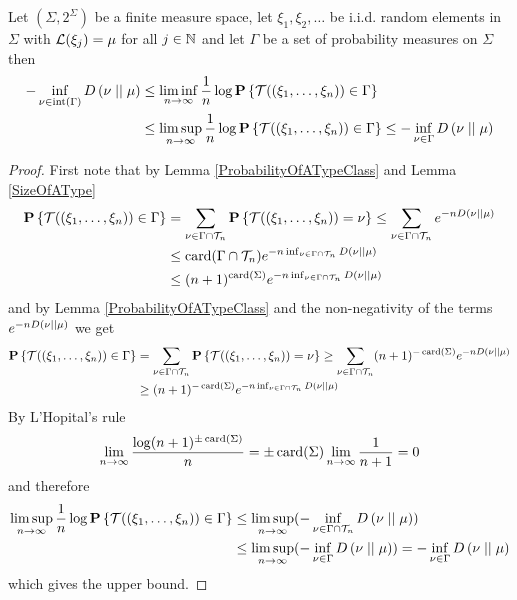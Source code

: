 \begin{thm}\label{SanovFiniteAlphabets}Let $(\Sigma, 2^\Sigma)$ be a finite measure space, let $\xi_1, \xi_2, \dotsc$ be i.i.d. random elements in $\Sigma$ with $\mathcal{L}(\xi_j) = \mu$ for all $j \in \mathbb{N}$ and let $\Gamma$ be a set of probability measures on $\Sigma$ then 
\begin{align*}
- \inf_{\nu \in \operatorname*{int} \left( \Gamma \right)} D\left( \nu \mid\mid \mu \right) 
&\leq \liminf_{n \to \infty} \frac{1}{n} \log \textbf{P}\left \{\mathcal{T}((\xi_1, \dotsc, \xi_n)) \in \Gamma \right \} \\
&\leq \limsup_{n \to \infty} \frac{1}{n} \log \textbf{P}\left \{\mathcal{T}((\xi_1, \dotsc, \xi_n)) \in \Gamma \right \} 
\leq - \inf_{\nu \in \Gamma} D\left( \nu \mid\mid \mu \right) \\
\end{align*}
\end{thm}
\begin{proof}
First note that by  Lemma \ref{ProbabilityOfATypeClass} and Lemma \ref{SizeOfAType}
\begin{align*}
\textbf{P}\left \{\mathcal{T}((\xi_1, \dotsc, \xi_n)) \in \Gamma \right \}
&= \sum_{\nu \in \Gamma \cap \mathcal{T}_{n}} \textbf{P}\left \{\mathcal{T}((\xi_1, \dotsc, \xi_n)) = \nu  \right \}
\leq \sum_{\nu \in \Gamma \cap \mathcal{T}_{n}} e^{-n D\left( \nu \mid\mid \mu \right)} \\
&\leq \operatorname*{card}(\Gamma \cap \mathcal{T}_{n}) e^{-n \inf_{\nu \in \Gamma \cap \mathcal{T}_{n}} D\left( \nu \mid\mid \mu \right)} \\
&\leq (n+1)^{\operatorname*{card}(\Sigma)} e^{-n \inf_{\nu \in \Gamma \cap \mathcal{T}_{n}} D\left( \nu \mid\mid \mu \right)} \\
\end{align*}
and by  Lemma \ref{ProbabilityOfATypeClass} and the non-negativity of the terms $ e^{-n D\left( \nu \mid\mid \mu \right)}$
we get
\begin{align*}
\textbf{P}\left \{\mathcal{T}((\xi_1, \dotsc, \xi_n)) \in \Gamma \right \}
&= \sum_{\nu \in \Gamma \cap \mathcal{T}_{n}} \textbf{P}\left \{\mathcal{T}((\xi_1, \dotsc, \xi_n)) = \nu  \right \}
\geq \sum_{\nu \in \Gamma \cap \mathcal{T}_{n}} (n+1)^{-\operatorname*{card}(\Sigma)} e^{-n D\left( \nu \mid\mid \mu \right)} \\
&\geq (n+1)^{-\operatorname*{card}(\Sigma)} e^{-n \inf_{\nu \in \Gamma \cap \mathcal{T}_{n}} D\left( \nu \mid\mid \mu \right)}
 \end{align*}
By L'Hopital's rule
\begin{align*}
\lim_{n \to \infty} \frac{\log (n+1)^{\pm\operatorname*{card}(\Sigma)}}{n} = \pm \operatorname*{card}(\Sigma) \lim_{n \to \infty} \frac{1}{n+1} =0
\end{align*}
and therefore
\begin{align*}
\limsup_{n \to \infty} \frac{1}{n} \log \textbf{P}\left \{\mathcal{T}((\xi_1, \dotsc, \xi_n)) \in \Gamma \right \} 
&\leq \limsup_{n \to \infty} (-\inf_{\nu \in \Gamma \cap \mathcal{T}_{n}} D\left( \nu \mid\mid \mu \right)) \\
&\leq \limsup_{n \to \infty} (-\inf_{\nu \in \Gamma} D\left( \nu \mid\mid \mu \right))
=-\inf_{\nu \in \Gamma} D\left( \nu \mid\mid \mu \right)
\end{align*}
which gives the upper bound.


\end{proof}
